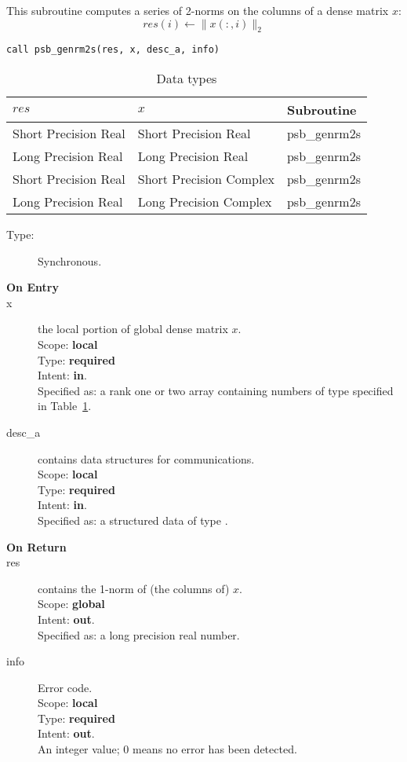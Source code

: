 This subroutine computes a series of  2-norms on the columns of
a  dense matrix  $x$: 
\[ res(i) \leftarrow \|x(:,i)\|_2 \]


\begin{verbatim}
call psb_genrm2s(res, x, desc_a, info)
\end{verbatim}

\begin{table}[h]
\begin{center}
\begin{tabular}{lll}
\hline
$res$ & $x$ & {\bf Subroutine}\\
\hline
Short Precision Real&Short Precision Real & psb\_genrm2s \\
Long Precision Real&Long Precision Real & psb\_genrm2s \\
Short Precision Real&Short Precision Complex & psb\_genrm2s \\
Long Precision Real&Long Precision Complex & psb\_genrm2s \\
\hline
\end{tabular}
\end{center}
\caption{Data types\label{tab:f90nrm2s}}
\end{table}

\begin{description}
\item[Type:] Synchronous.
\item[\bf On Entry]
\item[x] the local portion of global dense matrix
$x$. %
\\
Scope: {\bf local} \\
Type: {\bf required} \\
Intent: {\bf in}.\\
Specified as: a rank one or two array 
containing numbers of type specified in
Table~\ref{tab:f90nrm2s}.
\item[desc\_a] contains data structures for communications.\\
Scope: {\bf local} \\
Type: {\bf required}\\
Intent: {\bf in}.\\
Specified as: a structured data of type \descdata.

\item[\bf On Return] 
\item[res] contains the 1-norm of (the columns of) $x$.\\
Scope: {\bf global} \\
Intent: {\bf out}.\\
Specified as: a long precision real  number.
\item[info] Error code.\\
Scope: {\bf local} \\
Type: {\bf required} \\
Intent: {\bf out}.\\
An integer value; 0 means no error has been detected. 
\end{description}



